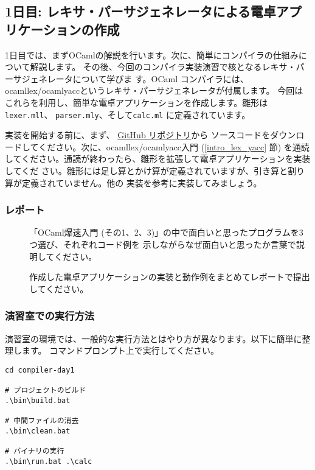 \documentclass[a4paper,11pt]{jsarticle}
\begin{document}
\subsection{1日目: レキサ・パーサジェネレータによる電卓アプリケーションの作成}


1日目では、まずOCamlの解説を行います。次に、簡単にコンパイラの仕組みについて解説します。
その後、今回のコンパイラ実装演習で核となるレキサ・パーサジェネレータについて学びま
す。OCaml コンパイラには、ocamllex/ocamlyaccというレキサ・パーサジェネレータが付属します。
今回はこれらを利用し、簡単な電卓アプリケーションを作成します。雛形は \verb|lexer.mll|、
\verb|parser.mly|、そして\verb|calc.ml| に定義されています。

実装を開始する前に、まず、
\href{https://github.com/tmu-compiler-info-sys-exp-I/compiler-day1}{GitHub リポジトリ}から
ソースコードをダウンロードしてください。次に、ocamllex/ocamlyacc入門 (\ref{intro_lex_yacc}
節) を通読してください。通読が終わったら、雛形を拡張して電卓アプリケーションを実装してくだ
さい。雛形には足し算とかけ算が定義されていますが、引き算と割り算が定義されていません。他の
実装を参考に実装してみましょう。

\subsubsection{レポート}

\begin{description}
\item []
  「OCaml爆速入門 (その1、2、3)」の中で面白いと思ったプログラムを3つ選び、それぞれコード例を
示しながらなぜ面白いと思ったか言葉で説明してください。
\item []
  作成した電卓アプリケーションの実装と動作例をまとめてレポートで提出してください。
\end{description}

\subsubsection{演習室での実行方法}

演習室の環境では、一般的な実行方法とはやり方が異なります。以下に簡単に整理します。
コマンドプロンプト上で実行してください。

\begin{lstlisting}
cd compiler-day1

# プロジェクトのビルド
.\bin\build.bat

# 中間ファイルの消去
.\bin\clean.bat

# バイナリの実行
.\bin\run.bat .\calc
\end{lstlisting}
\end{document}
